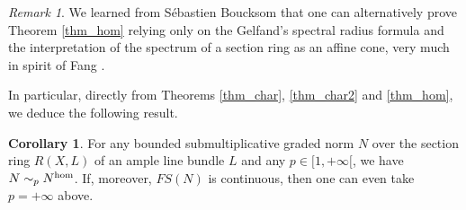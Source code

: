 \documentclass[12pt]{article}
\numberwithin{equation}{section}
\theoremstyle{theorem}
\theoremstyle{definition}
\newtheorem{cor}[thm]{Corollary}
\theoremstyle{remark}
\newtheorem{rem}[thm]{Remark}
\newcommand{\comp}{\mathbb{C}}
\begin{document}
	\begin{rem}

		We learned from Sébastien Boucksom that one can alternatively prove Theorem \ref{thm_hom} relying only on the Gelfand’s spectral radius formula and the interpretation of the spectrum of a section ring as an affine cone, very much in spirit of Fang \cite[Proposition 3.15]{FangNonArch}.
	\end{rem}
	In particular, directly from Theorems \ref{thm_char}, \ref{thm_char2} and \ref{thm_hom}, we deduce the following result.
	\begin{cor}\label{cor_str_val}
		For any bounded submultiplicative graded norm $N$ over the section ring $R(X, L)$ of an ample line bundle $L$ and any $p \in [1, +\infty[$, we have
		$
			N \sim_p N^{{\rm{hom}}}
		$.
		If, moreover, $FS(N)$ is continuous, then one can even take $p = +\infty$ above.
	\end{cor}
\end{document}
